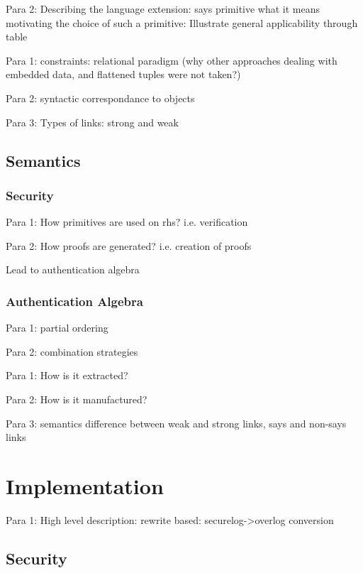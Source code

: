 Para 2: Describing the language extension: says primitive what it means
motivating the choice of such a primitive: Illustrate general applicability through table


Para 1: constraints: relational paradigm (why other approaches dealing with embedded data, and flattened tuples were not taken?)

Para 2: syntactic correspondance to objects

Para 3: Types of links: strong and weak

\subsection{Semantics}

\subsubsection{Security}

Para 1: How primitives are used on rhs? i.e. verification 

Para 2: How proofs are generated? i.e. creation of proofs

Lead to authentication algebra

\subsubsection{Authentication Algebra}

Para 1: partial ordering

Para 2: combination strategies


Para 1: How is it extracted?

Para 2: How is it manufactured? 

Para 3: semantics difference between weak and strong links, says and non-says links

\section{Implementation}

Para 1: High level description: rewrite based: securelog->overlog conversion

\subsection{Security}

